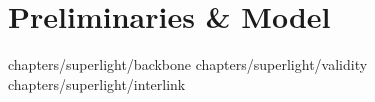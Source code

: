 \section{Preliminaries \& Model}


{chapters/superlight/backbone}
{chapters/superlight/validity}
{chapters/superlight/interlink}

